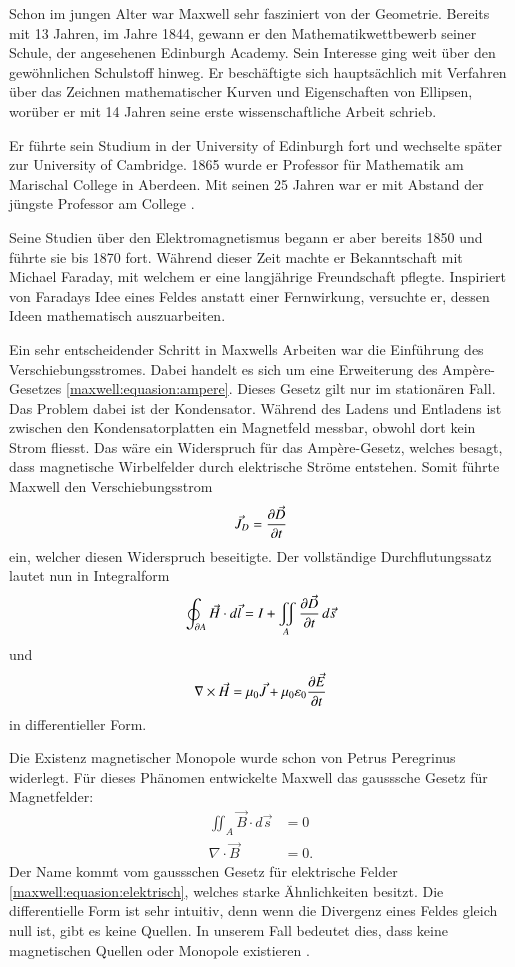 Schon im jungen Alter war Maxwell sehr fasziniert von der Geometrie. Bereits mit 13 Jahren, im Jahre 1844, gewann er den Mathematikwettbewerb seiner Schule, der angesehenen Edinburgh Academy.
%
Sein Interesse ging weit über den gewöhnlichen Schulstoff hinweg.
Er beschäftigte sich hauptsächlich mit Verfahren über das Zeichnen mathematischer Kurven und Eigenschaften von Ellipsen, worüber er mit 14 Jahren seine erste wissenschaftliche Arbeit schrieb.

Er führte sein Studium in der University of Edinburgh fort und wechselte später zur University of Cambridge.
%
1865 wurde er Professor für Mathematik am Marischal College in Aberdeen.
%
%
Mit seinen 25 Jahren war er mit Abstand der jüngste Professor am College \cite{maxwell:maxwell}.

Seine Studien über den Elektromagnetismus begann er aber bereits 1850 und führte sie bis 1870 fort. 
Während dieser Zeit machte er Bekanntschaft mit Michael Faraday, mit welchem er eine langjährige Freundschaft pflegte.
Inspiriert von Faradays Idee eines Feldes anstatt einer Fernwirkung, versuchte er, dessen Ideen mathematisch auszuarbeiten.

Ein sehr entscheidender Schritt in Maxwells Arbeiten war die Einführung des Verschiebungsstromes.
%
Dabei handelt es sich um eine Erweiterung des Ampère-Gesetzes \eqref{maxwell:equasion:ampere}.
Dieses Gesetz gilt nur im stationären Fall.
Das Problem dabei ist der Kondensator.
%
Während des Ladens und Entladens ist zwischen den Kondensatorplatten ein Magnetfeld messbar, obwohl dort kein Strom fliesst.
Das wäre ein Widerspruch für das Ampère-Gesetz, welches besagt, dass magnetische Wirbelfelder durch elektrische Ströme entstehen.
Somit führte Maxwell den Verschiebungsstrom
\[
\vec{J}_D = \frac{\d \vec{D}}{\d t}
\]
ein, welcher diesen Widerspruch beseitigte.
Der vollständige Durchflutungssatz lautet nun in Integralform
\[
\oint_{\d A}
\vec{H}
\cdot
d\vec{l}
=
I
+
\iint_{A}
\frac{\d \vec{D}}{\d t} 
\,
d\vec{s}
\]
und 
\[
\nabla
\times
\vec{H}
=
\mu_0 \vec{J}
+
\mu_0 \varepsilon_0 \frac{\d \vec{E}}{\d t}
\]
in differentieller Form.

Die Existenz magnetischer Monopole wurde schon von Petrus Peregrinus widerlegt.
%
Für dieses Phänomen entwickelte Maxwell das gausssche Gesetz für Magnetfelder:
\begin{align*}
\iint_{A}
\vec{B} \cdot d\vec{s}
&=
0
\\
\nabla \cdot \vec{B} &= 0 .
\end{align*}
Der Name kommt vom gaussschen Gesetz für elektrische Felder \eqref{maxwell:equasion:elektrisch}, welches starke Ähnlichkeiten besitzt.
Die differentielle Form ist sehr intuitiv, denn wenn die Divergenz eines Feldes gleich null ist, gibt es keine Quellen. 
In unserem Fall bedeutet dies, dass keine magnetischen Quellen oder Monopole existieren \cite{maxwell:equasions}.

